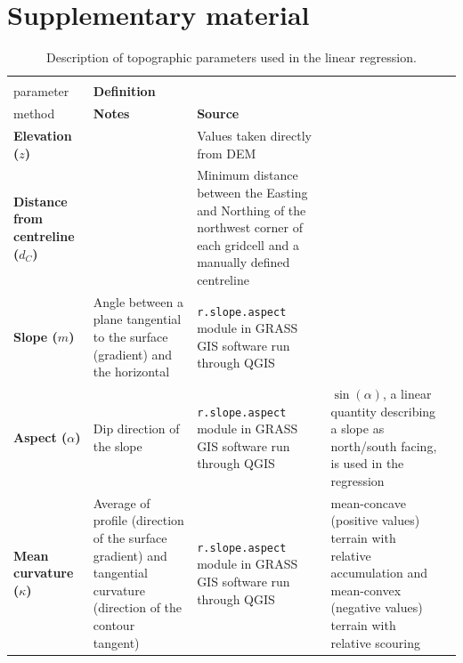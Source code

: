 \documentclass[twocolumn, letterpaper]{igs}
\begin{document}
%

%


\pagebreak 
\section{Supplementary material}

\begin{table}[!htbp]
\centering%
\caption{Description of topographic parameters used in the linear regression.}
\label{tab:TopoParams}
\begin{tabularx}{\linewidth}{XXXXX}
\midrule
\textbf{\begin{tabular}[c]{@{}l@{}}Topographic\\ parameter\end{tabular}} & \textbf{Definition} & \textbf{\begin{tabular}[c]{@{}l@{}}Calculation \\ method\end{tabular}} & \textbf{Notes} & \textbf{Source} \\ \midrule
\textbf{Elevation ($z$)} &  & Values taken directly from DEM &  &  \\
\textbf{Distance from centreline ($d_C$)} &  & Minimum distance between the Easting and Northing of the northwest corner of each gridcell and a manually defined centreline &  &  \\
\textbf{Slope ($m$)} & Angle between a plane tangential to the surface (gradient) and the horizontal & \texttt{r.slope.aspect} module in GRASS GIS software run through QGIS &  & \cite{Mitavsova1993, Hofierka2009, Olaya2009} \\
\textbf{Aspect ($\alpha$)} & Dip direction of the slope & \texttt{r.slope.aspect} module in GRASS GIS software run through QGIS & $\sin(\alpha)$, a linear quantity describing a slope as north/south facing, is used in the regression & \cite{Mitavsova1993, Hofierka2009, Olaya2009} \\
\textbf{Mean curvature ($\kappa$)} & Average of profile (direction of the surface gradient) and tangential curvature (direction of the contour tangent) & \texttt{r.slope.aspect} module in GRASS GIS software run through QGIS & mean-concave (positive values) terrain with relative accumulation and mean-convex (negative values) terrain with relative scouring & \cite{Mitavsova1993, Hofierka2009, Olaya2009} \\

\end{tabularx}
\end{table}
\end{document}
